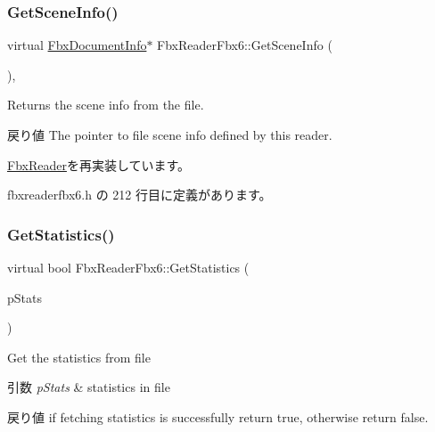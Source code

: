 \subsubsection{\texorpdfstring{Get\+Scene\+Info()}{GetSceneInfo()}}
{\footnotesize\ttfamily virtual \hyperlink{class_fbx_document_info}{Fbx\+Document\+Info}$\ast$ Fbx\+Reader\+Fbx6\+::\+Get\+Scene\+Info (\begin{DoxyParamCaption}{ }\end{DoxyParamCaption})\hspace{0.3cm}{\ttfamily [inline]}, {\ttfamily [virtual]}}

Returns the scene info from the file. \begin{DoxyReturn}{戻り値}
The pointer to file scene info defined by this reader. 
\end{DoxyReturn}


\hyperlink{class_fbx_reader_acb928634641ad5f99d709478c7a234be}{Fbx\+Reader}を再実装しています。



 fbxreaderfbx6.\+h の 212 行目に定義があります。

\mbox{\label{class_fbx_reader_fbx6_a72865fb347314f30b81b56767fe91a5b}} 
\subsubsection{\texorpdfstring{Get\+Statistics()}{GetStatistics()}}
{\footnotesize\ttfamily virtual bool Fbx\+Reader\+Fbx6\+::\+Get\+Statistics (\begin{DoxyParamCaption}\item[{\hyperlink{class_fbx_statistics}{Fbx\+Statistics} $\ast$}]{p\+Stats }\end{DoxyParamCaption})\hspace{0.3cm}{\ttfamily [virtual]}}

Get the statistics from file 
\begin{DoxyParams}{引数}
{\em p\+Stats} & statistics in file \\
\hline
\end{DoxyParams}
\begin{DoxyReturn}{戻り値}
if fetching statistics is successfully return {\ttfamily true}, otherwise return {\ttfamily false}. 
\end{DoxyReturn}


